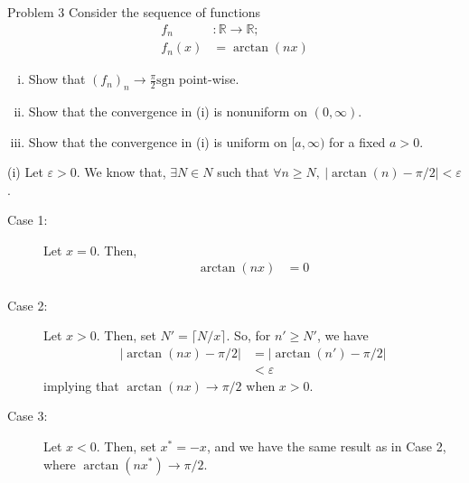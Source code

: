\documentclass[8pt]{extarticle}
\newcommand{\R}{\mathbb{R}}
\begin{document}
  \begin{problem}{Problem 3}
    Consider the sequence of functions
    \begin{align*}
      f_n&: \R\rightarrow \R;\\
      f_n(x) &= \arctan(nx)
    \end{align*}
    \begin{enumerate}[(i)]
      \item Show that $(f_n)_n \rightarrow \frac{\pi}{2}\text{sgn}$ point-wise.
      \item Show that the convergence in (i) is nonuniform on $(0,\infty)$.
      \item Show that the convergence in (i) is uniform on $[a,\infty)$ for a fixed $a > 0$.
    \end{enumerate}
    \tcblower
    \begin{problem}{(i)}
      Let $\varepsilon > 0$. We know that, $\exists N \in N$ such that $\forall n \geq N,~|\arctan(n) - \pi/2| < \varepsilon$.
      \begin{description}
        \item[Case 1:] Let $x = 0$. Then,
          \begin{align*}
            \arctan(nx) &= 0\tag*{$\forall n \geq 1$}\\
          \end{align*}
        \item[Case 2:] Let $x > 0$. Then, set $N' = \lceil N/x\rceil$. So, for $n'\geq N'$, we have 
          \begin{align*}
            \left|\arctan(nx) - \pi/2\right| &= \left|\arctan(n') - \pi/2\right|\\
                                  &< \varepsilon
          \end{align*}
          implying that $\arctan(nx) \rightarrow \pi/2$ when $x > 0$.
        \item[Case 3:] Let $x < 0$. Then, set $x^{\ast} = -x$, and we have the same result as in Case 2, where $\arctan(nx^{\ast}) \rightarrow \pi/2$.\\


\end{description}
\end{problem}
\end{problem}
\end{document}
